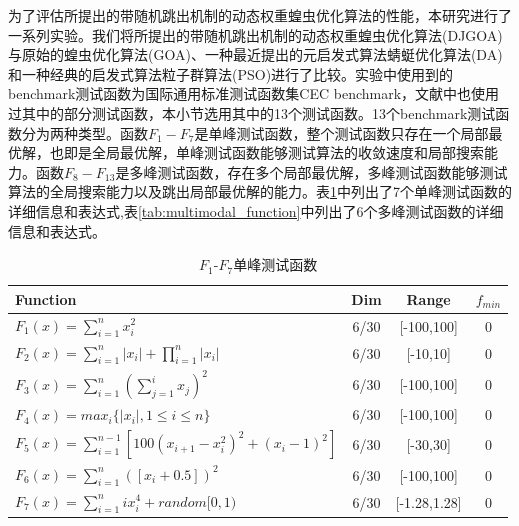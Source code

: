 为了评估所提出的带随机跳出机制的动态权重蝗虫优化算法的性能，本研究进行了一系列实验。我们将所提出的带随机跳出机制的动态权重蝗虫优化算法(DJGOA)与原始的蝗虫优化算法(GOA)、一种最近提出的元启发式算法蜻蜓优化算法(DA)和一种经典的启发式算法粒子群算法(PSO)进行了比较。实验中使用到的benchmark测试函数为国际通用标准测试函数集CEC benchmark\cite{molga2005test}，文献\cite{saremi2017grasshopper}中也使用过其中的部分测试函数，本小节选用其中的13个测试函数。13个benchmark测试函数分为两种类型。函数$F_1-F_7$是单峰测试函数，整个测试函数只存在一个局部最优解，也即是全局最优解，单峰测试函数能够测试算法的收敛速度和局部搜索能力。函数$F_8-F_{13}$是多峰测试函数，存在多个局部最优解，多峰测试函数能够测试算法的全局搜索能力以及跳出局部最优解的能力。表\ref{tab:unimodal_function}中列出了7个单峰测试函数的详细信息和表达式,表\ref{tab:multimodal_function}中列出了6个多峰测试函数的详细信息和表达式。
\begin{table}[!htbp]
    \centering
    \caption{$F_1$-$F_7$单峰测试函数}
    \label{tab:unimodal_function}
    \renewcommand\arraystretch{1.5} 
\begin{tabular}{l c c c}
  \hline
  Function & Dim & Range & $f_{min}$ \\
  \hline
  $F_1(x)=\sum_{i=1}^n x_i^2$ & 6/30 & [-100,100]&0 \\
  \hline
  $F_2(x)=\sum_{i=1}^n\left|x_i\right|+\prod_{i=1}^n\left|x_i\right|$& 6/30 & [-10,10]&0 \\
  \hline
  $F_3(x)=\sum_{i=1}^n(\sum_{j=1}^ix_j)^2$& 6/30 & [-100,100] & 0\\
  \hline
  $F_4(x)=max_i\{\left|x_i\right|,1\leq i\leq n\}$& 6/30 & [-100,100] & 0\\
  \hline
  $F_5(x)=\sum_{i=1}^{n-1}[100(x_{i+1}-x_i^2)^2+(x_i-1)^2]$& 6/30 & [-30,30] & 0\\
  \hline
  $F_6(x)=\sum_{i=1}^n([x_i+0.5])^2$& 6/30 & [-100,100] & 0\\
  \hline
  $F_7(x)=\sum_{i=1}^n ix_i^4 + random[0,1)$& 6/30 & [-1.28,1.28] & 0\\
  \hline
\end{tabular}
\end{table}



